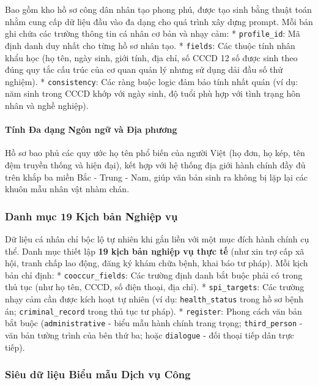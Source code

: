 \documentclass[
  11pt,
  a4paper,
]{article}
\begin{document}
Bao gồm kho hồ sơ công dân nhân tạo phong phú, được tạo sinh bằng thuật toán nhằm cung cấp dữ liệu
đầu vào đa dạng cho quá trình xây dựng prompt. Mỗi bản ghi chứa các trường thông tin cá nhân cơ bản
và nhạy cảm: * \texttt{profile\_id}: Mã định danh duy nhất cho từng hồ sơ nhân tạo. *
\texttt{fields}: Các thuộc tính nhân khẩu học (họ tên, ngày sinh, giới tính, địa chỉ, số CCCD 12 số
được sinh theo đúng quy tắc cấu trúc của cơ quan quản lý nhưng sử dụng dải đầu số thử nghiệm). *
\texttt{consistency}: Các ràng buộc logic đảm bảo tính nhất quán (ví dụ: năm sinh trong CCCD khớp
với ngày sinh, độ tuổi phù hợp với tình trạng hôn nhân và nghề nghiệp).

\paragraph{Tính Đa dạng Ngôn ngữ và Địa
phương}\label{tuxednh-ux111a-dux1ea1ng-nguxf4n-ngux1eef-vuxe0-ux111ux1ecba-phux1b0ux1a1ng}

Hồ sơ bao phủ các quy ước họ tên phổ biến của người Việt (họ đơn, họ kép, tên đệm truyền thống và
hiện đại), kết hợp với hệ thống địa giới hành chính đầy đủ trên khắp ba miền Bắc - Trung - Nam, giúp
văn bản sinh ra không bị lặp lại các khuôn mẫu nhân vật nhàm chán.

\subsubsection{Danh mục 19 Kịch bản Nghiệp
vụ}\label{danh-mux1ee5c-19-kux1ecbch-bux1ea3n-nghiux1ec7p-vux1ee5}

Dữ liệu cá nhân chỉ bộc lộ tự nhiên khi gắn liền với một mục đích hành chính cụ thể. Danh mục thiết
lập \textbf{19 kịch bản nghiệp vụ thực tế} (như xin trợ cấp xã hội, tranh chấp lao động, đăng ký
khám chữa bệnh, khai báo tư pháp). Mỗi kịch bản chỉ định: * \texttt{cooccur\_fields}: Các trường
định danh bắt buộc phải có trong thủ tục (như họ tên, CCCD, số điện thoại, địa chỉ). *
\texttt{spi\_targets}: Các trường nhạy cảm cần được kích hoạt tự nhiên (ví dụ:
\texttt{health\_status} trong hồ sơ bệnh án; \texttt{criminal\_record} trong thủ tục tư pháp). *
\texttt{register}: Phong cách văn bản bắt buộc (\texttt{administrative} - biểu mẫu hành chính trang
trọng; \texttt{third\_person} - văn bản tường trình của bên thứ ba; hoặc \texttt{dialogue} - đối
thoại tiếp dân trực tiếp).

\subsubsection{Siêu dữ liệu Biểu mẫu Dịch vụ
Công}\label{siuxeau-dux1eef-liux1ec7u-biux1ec3u-mux1eabu-dux1ecbch-vux1ee5-cuxf4ng}
\end{document}
